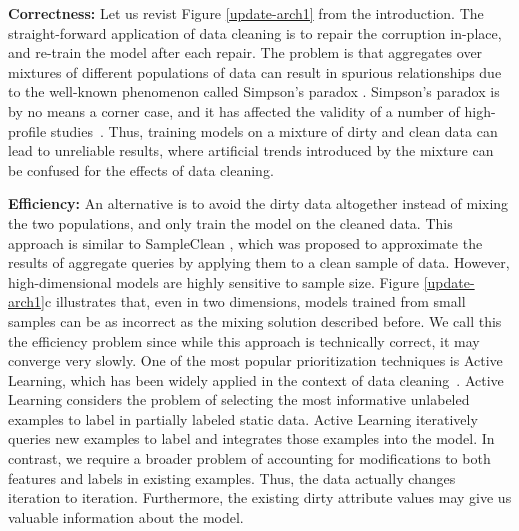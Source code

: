 \vspace{0.5em}
\noindent \textbf{Correctness: } Let us revist Figure \ref{update-arch1} from the introduction. 
The straight-forward application of data cleaning is to repair the corruption in-place, and re-train the model after each repair.
The problem is that aggregates over mixtures of different populations of data can result in spurious relationships due to the well-known phenomenon called Simpson's paradox \cite{simpson1951interpretation}.
Simpson's paradox is by no means a corner case, and it has affected the validity of a number of high-profile studies~\cite{pearl2003causality}.
Thus, training models on a mixture of dirty and clean data can lead to unreliable results, where artificial trends introduced by the mixture can be confused for the effects of data cleaning.

\vspace{0.5em}
\noindent \textbf{Efficiency: } An alternative is to avoid the dirty data altogether instead of mixing the two populations, and only train the model on the cleaned data.
This approach is similar to SampleClean \cite{wang1999sample}, which was proposed to approximate the results of aggregate queries by applying them to a clean sample of data.
However, high-dimensional models are highly sensitive to sample size.
Figure \ref{update-arch1}c illustrates that, even in two dimensions, models trained from small samples can be as incorrect as the mixing solution described before.
We call this the efficiency problem since while this approach is technically correct, it may converge very slowly.
One of the most popular prioritization techniques is Active Learning, which has been widely applied in the context of data cleaning~\cite{DBLP:journals/pvldb/YakoutENOI11,gokhale2014corleone}.
Active Learning considers the problem of selecting the most informative unlabeled examples to label in partially labeled static data.
Active Learning iteratively queries new examples to label and integrates those examples into the model.
In contrast, we require a broader problem of accounting for modifications to both features and labels in existing examples.
Thus, the data actually changes iteration to iteration.
Furthermore, the existing dirty attribute values may give us valuable information about the model. 




